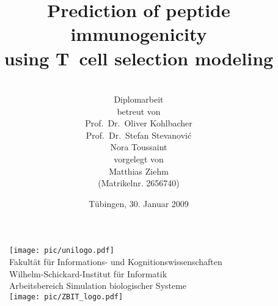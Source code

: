 \documentclass[a4paper, 12pt, twoside]{report} %
\title{ \huge \textbf{Prediction of peptide immunogenicity\\using T~cell selection modeling}}
\author{\\[5ex]
  \Large Diplomarbeit \\[2ex]
  \small betreut von \\
  \large Prof.~Dr.~Oliver Kohlbacher\\
  \large Prof.~Dr.~Stefan Stevanovi\'{c}\\
  \large Nora Toussaint\\[2ex]
  \small  vorgelegt von \\
  \large Matthias Ziehm\\
  \large (Matrikelnr. 2656740)\\[5ex]}
\date{T\"ubingen, 30. Januar 2009}
\begin{document}
\pagestyle{empty}

\begin{figure}
\centering
\texttt{[image: pic/unilogo.pdf]}\ \\[2ex]

\large Fakult\"at f\"ur Informations- und Kognitionswissenschaften\\
\large Wilhelm-Schickard-Institut f\"ur Informatik\\
\large Arbeitsbereich Simulation biologischer Systeme\\[3ex]

\texttt{[image: pic/ZBIT\_logo.pdf]}
\label{titlepictures}
\end{figure}


\maketitle
\cleardoublepage

\newpage
{}\setcounter{page}{1}
\tableofcontents
\listoffigures
\listoftables



\cleardoublepage
\pagestyle{fancy}
\renewcommand{\sectionmark}[1]{\markboth{\textsc{\thesection.\ #1}}{\textsc{\thesection.\ #1}}}
\renewcommand{\subsectionmark}[1]{\markright{\textsc{\thesubsection.\ #1}}}
\setcounter{page}{1}

\onehalfspacing	
  
	
	
	
	

\begin{appendix}

\end{appendix}

\clearpage
\pagestyle{empty}
\cleardoublepage
\pagestyle{fancy}





\end{document}
